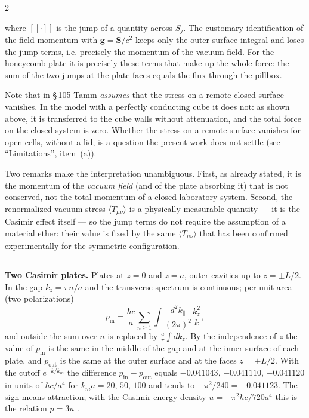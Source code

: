 \documentclass[twoside, 10pt]{article}
\def\myvspacebeforesubsection{-2.0mm}
\def\myvspaceaftersubsection{-2.5mm}
\begin{document}
\begin{multicols}{2}

where \([\![\cdot]\!]\) is the jump of a quantity across \(S_j\). The customary identification of the field momentum with \(\mathbf{g}=\mathbf{S}/c^2\) keeps only the outer surface integral and loses the jump terms, i.e. precisely the momentum of the vacuum field. For the honeycomb plate it is precisely these terms that make up the whole force: the
sum of the two jumps at the plate faces equals the flux through the pillbox.

Note that in \S\,105 Tamm \emph{assumes} that the stress on a remote closed surface vanishes. In the model with a perfectly conducting cube it does not: as shown above, it is transferred to the cube walls without attenuation, and the total force on the closed system is zero. Whether the stress on a remote surface vanishes for open cells, without a lid, is a question the present work does not settle (see ``Limitations'', item~(a)).

Two remarks make the interpretation unambiguous. First, as already stated, it is the momentum of the \emph{vacuum field} (and of the plate absorbing it) that is not conserved, not the total momentum of a
closed laboratory system. Second, the renormalized vacuum stress \(\langle T_{\mu\nu}\rangle\) is a
physically measurable quantity --- it is the Casimir effect itself --- so the jump terms do not
require the assumption of a material ether: their value is fixed by the same
\(\langle T_{\mu\nu}\rangle\) that has been confirmed experimentally for the symmetric
configuration.

\vspace{\myvspacebeforesubsection}
\subsection*{}
\vspace{\myvspaceaftersubsection}


\textbf{Two Casimir plates.} Plates at \(z=0\) and \(z=a\), outer cavities up to \(z=\pm L/2\). In
the gap \(k_z=\pi n/a\) and the transverse spectrum is continuous; per unit area (two polarizations)
\[
p_{\text{in}}=\frac{\hbar c}{a}\sum_{n\ge1}\int\frac{d^2k_\parallel}{(2\pi)^2}\frac{k_z^2}{k},
\]
and outside the sum over \(n\) is replaced by \(\frac a\pi\int dk_z\). By the independence of \(z\)
the value of \(p_{\text{in}}\) is the same in the middle of the gap and at the inner surface of each
plate, and \(p_{\text{out}}\) is the same at the outer surface and at the faces \(z=\pm L/2\). With
the cutoff \(e^{-k/k_m}\) the difference \(p_{\text{in}}-p_{\text{out}}\) equals \(-0.041043\),
\(-0.041110\), \(-0.041120\) in units of \(\hbar c/a^4\) for \(k_ma=20\), \(50\), \(100\) and tends
to \(-\pi^2/240=-0.041123\). The sign means attraction; with the Casimir energy density
\(u=-\pi^2\hbar c/720a^4\) this is the relation \(p=3u\) \cite{BrownMaclay1969}.


\end{multicols}
\end{document}
